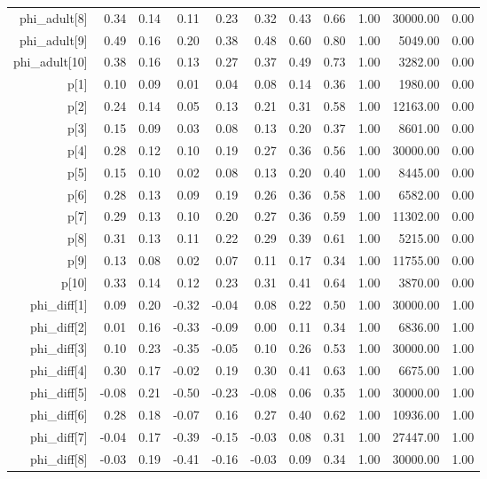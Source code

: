 \begin{table}[ht]
\begin{tabular}{rrrrrrrrrrr}
  phi\_adult[8] & 0.34 & 0.14 & 0.11 & 0.23 & 0.32 & 0.43 & 0.66 & 1.00 & 30000.00 & 0.00 \\ 
  phi\_adult[9] & 0.49 & 0.16 & 0.20 & 0.38 & 0.48 & 0.60 & 0.80 & 1.00 & 5049.00 & 0.00 \\ 
  phi\_adult[10] & 0.38 & 0.16 & 0.13 & 0.27 & 0.37 & 0.49 & 0.73 & 1.00 & 3282.00 & 0.00 \\ 
  p[1] & 0.10 & 0.09 & 0.01 & 0.04 & 0.08 & 0.14 & 0.36 & 1.00 & 1980.00 & 0.00 \\ 
  p[2] & 0.24 & 0.14 & 0.05 & 0.13 & 0.21 & 0.31 & 0.58 & 1.00 & 12163.00 & 0.00 \\ 
  p[3] & 0.15 & 0.09 & 0.03 & 0.08 & 0.13 & 0.20 & 0.37 & 1.00 & 8601.00 & 0.00 \\ 
  p[4] & 0.28 & 0.12 & 0.10 & 0.19 & 0.27 & 0.36 & 0.56 & 1.00 & 30000.00 & 0.00 \\ 
  p[5] & 0.15 & 0.10 & 0.02 & 0.08 & 0.13 & 0.20 & 0.40 & 1.00 & 8445.00 & 0.00 \\ 
  p[6] & 0.28 & 0.13 & 0.09 & 0.19 & 0.26 & 0.36 & 0.58 & 1.00 & 6582.00 & 0.00 \\ 
  p[7] & 0.29 & 0.13 & 0.10 & 0.20 & 0.27 & 0.36 & 0.59 & 1.00 & 11302.00 & 0.00 \\ 
  p[8] & 0.31 & 0.13 & 0.11 & 0.22 & 0.29 & 0.39 & 0.61 & 1.00 & 5215.00 & 0.00 \\ 
  p[9] & 0.13 & 0.08 & 0.02 & 0.07 & 0.11 & 0.17 & 0.34 & 1.00 & 11755.00 & 0.00 \\ 
  p[10] & 0.33 & 0.14 & 0.12 & 0.23 & 0.31 & 0.41 & 0.64 & 1.00 & 3870.00 & 0.00 \\ 
  phi\_diff[1] & 0.09 & 0.20 & -0.32 & -0.04 & 0.08 & 0.22 & 0.50 & 1.00 & 30000.00 & 1.00 \\ 
  phi\_diff[2] & 0.01 & 0.16 & -0.33 & -0.09 & 0.00 & 0.11 & 0.34 & 1.00 & 6836.00 & 1.00 \\ 
  phi\_diff[3] & 0.10 & 0.23 & -0.35 & -0.05 & 0.10 & 0.26 & 0.53 & 1.00 & 30000.00 & 1.00 \\ 
  phi\_diff[4] & 0.30 & 0.17 & -0.02 & 0.19 & 0.30 & 0.41 & 0.63 & 1.00 & 6675.00 & 1.00 \\ 
  phi\_diff[5] & -0.08 & 0.21 & -0.50 & -0.23 & -0.08 & 0.06 & 0.35 & 1.00 & 30000.00 & 1.00 \\ 
  phi\_diff[6] & 0.28 & 0.18 & -0.07 & 0.16 & 0.27 & 0.40 & 0.62 & 1.00 & 10936.00 & 1.00 \\ 
  phi\_diff[7] & -0.04 & 0.17 & -0.39 & -0.15 & -0.03 & 0.08 & 0.31 & 1.00 & 27447.00 & 1.00 \\ 
  phi\_diff[8] & -0.03 & 0.19 & -0.41 & -0.16 & -0.03 & 0.09 & 0.34 & 1.00 & 30000.00 & 1.00 \\ 

\end{tabular}
\end{table}
